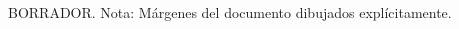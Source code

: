 \thispagestyle{empty}
\begin{titlepage}
    \vspace*{\fill}
    \begin{center}
        {\crest} \\[1.3cm]
        {\Large \gradua}\\
        {\espezialitatea}\\[1.5cm]

        {\large {\gapizenburua}}\\[0.2cm]
        \HRule \\[0.5cm]

        {
        \LARGE
        \begin{spacing}{0.5}
        \textbf{\izenburua}
        \end{spacing}
        }
        \vspace{0.5cm}
        \HRule \\[2.0cm]

        {\egileatestua \\}
        {\textsl{\egilea}\\}
        \vspace{2.0cm}
        {\zuzendariaktestua \\}
        {\zuzendariak \\}
        \begin{tcolorbox}[breakable]
            BORRADOR. Nota: Márgenes del documento dibujados explícitamente.
        \end{tcolorbox}
    \end{center}
    \vspace*{\fill}
\end{titlepage}
\restoregeometry %
\cleardoublepage

